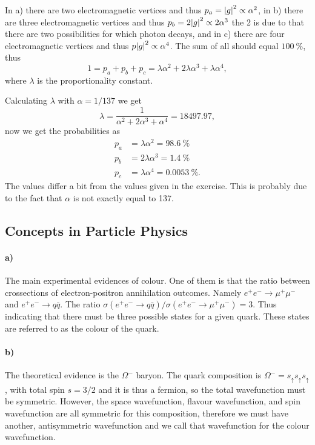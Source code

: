 In a) there are two electromagnetic vertices and thus $p_a = \abs{g}^2 \propto \alpha^2$, in b) there are three electromagnetic vertices and thus $p_b = 2\abs{g}^2 \propto 2\alpha^3$ the 2 is due to that there are two possibilities for which photon decays, and in c) there are four electromagnetic vertices and thus $p\abs{g}^2 \propto \alpha^4$. The sum of all should equal $\SI{100}{\percent}$, thus
\begin{equation}
	1 = p_a + p_b + p_c = \lambda\alpha^2 + 2\lambda\alpha^3 + \lambda\alpha^4,
\end{equation}
where $\lambda$ is the proportionality constant.


Calculating $\lambda$ with $\alpha = 1/137$ we get 
\begin{equation}
	\lambda = \frac{1}{\alpha^2 + 2\alpha^3 + \alpha^4} = 18497.97,
\end{equation}
now we get the probabilities as 
\begin{align}
	p_a &= \lambda\alpha^2 = \SI{98.6}{\percent}\\
	p_b &= 2\lambda\alpha^3 = \SI[]{1.4}{\percent}\\
	p_c &= \lambda\alpha^4 = \SI[]{0.0053}{\percent}.
\end{align}
The values differ a bit from the values given in the exercise. This is probably due to the fact that $\alpha$ is not exactly equal to 137.

\subsection{Concepts in Particle Physics}
\paragraph{a)} The main experimental evidences of colour. One of them is that the ratio between crossections of electron-positron annihilation outcomes. Namely $e^+ e^- \to \mu^+ \mu^-$ and $e^+ e^- \to q \bar{q}$. The ratio $\sigma(e^+ e^- \to q \bar{q})/\sigma(e^+ e^- \to \mu^+ \mu^-) = 3$. Thus indicating that there must be three possible states for a given quark. These states are referred to as the colour of the quark. 

\paragraph{b)} The theoretical evidence is the $\Omega^-$ baryon. The quark composition is $\Omega^- = s_\uparrow s_\uparrow s_\uparrow$, with total spin $s = 3/2$ and it is thus a fermion, so the total wavefunction must be symmetric. However, the space wavefunction, flavour wavefunction, and spin wavefunction are all symmetric for this composition, therefore we must have another, antisymmetric wavefunction and we call that wavefunction for the colour wavefunction.

